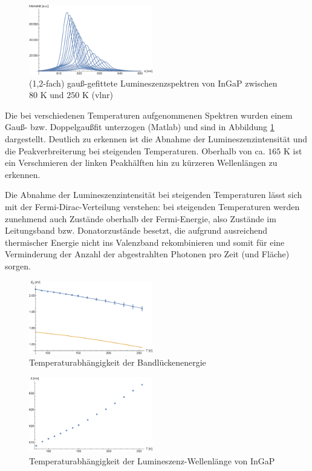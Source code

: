 \documentclass[aps,twocolumn,secnumarabic,nobalancelastpage,amsmath,amssymb,
nofootinbib,superscriptaddress]{revtex4-1}
\begin{document}

\begin{figure}[h!]
  \centering
  \includegraphics[width=0.48\textwidth]{../Messung/allfitsplot.eps}
  \caption{\label{fig:spek} (1,2-fach) gauß-gefittete Lumineszenzspektren von InGaP zwischen $80\text{ K}$ und $250\text{ K}$ (vlnr)}
\end{figure}

\noindent Die bei verschiedenen Temperaturen aufgenommenen Spektren wurden einem Gauß- bzw. Doppelgaußfit
unterzogen (Matlab) und sind in Abbildung \ref{fig:spek} dargestellt. Deutlich zu erkennen ist die Abnahme der
Lumineszenzintensität und die Peakverbreiterung bei steigenden Temperaturen. Oberhalb von ca. $165\text{ K}$
ist ein Verschmieren der linken Peakhälften hin zu kürzeren Wellenlängen zu erkennen.

Die Abnahme der Lumineszenzintensität bei steigenden Temperaturen lässt sich mit der Fermi-Dirac-Verteilung
verstehen: bei steigenden Temperaturen werden zunehmend auch Zustände oberhalb der Fermi-Energie, also Zustände
im Leitungsband bzw. Donatorzustände besetzt, die aufgrund ausreichend thermischer Energie nicht ins Valenzband
rekombinieren und somit für eine Verminderung der Anzahl der abgestrahlten Photonen pro Zeit (und Fläche) sorgen.

\begin{figure}[t]
  \centering
  \includegraphics[width=0.48\textwidth]{../Messung/energtemp.eps}
  \caption{\label{fig:EgapT} Temperaturabhängigkeit der Bandlückenenergie}
\end{figure}

\begin{figure}[b]
  \centering
  \includegraphics[width=0.48\textwidth]{../Messung/peaktemp.eps}
  \caption{\label{fig:lamT} Temperaturabhängigkeit der Lumineszenz-Wellenlänge von InGaP}
\end{figure}
\end{document}
